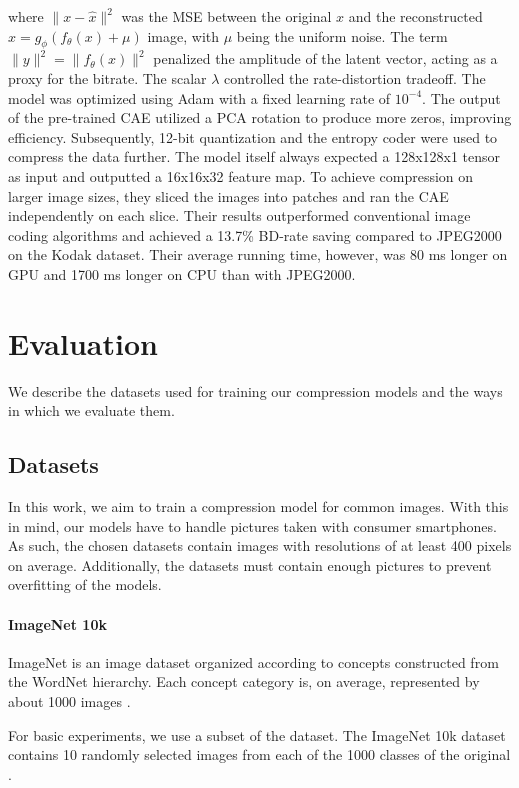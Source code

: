 \documentclass[conference]{IEEEtran}
\begin{document}
\noindent where $\|x - \hat{x}\|^2$ was the MSE between the original $x$ 
and the reconstructed $\hat{x} = g_\phi(f_\theta(x) + \mu)$ image, with $\mu$ being the 
uniform noise. 
The term $\|y\|^2 = \|f_\theta(x)\|^2$ penalized the amplitude of the latent vector, 
acting as a proxy for the bitrate. The scalar $\lambda$ controlled the rate-distortion 
tradeoff. The model was optimized using Adam with a fixed learning rate of $10^{-4}$. The output of the pre-trained CAE utilized a PCA rotation to produce more zeros, improving efficiency. Subsequently, 12-bit quantization and the entropy coder were used to compress the data further. The model itself always expected a 128x128x1 tensor as input and outputted a 16x16x32 feature map. To achieve compression on larger image sizes, they sliced the images into patches and ran the CAE independently on each slice. Their results outperformed conventional image coding algorithms and achieved a 13.7\% BD-rate saving compared to JPEG2000 on the Kodak dataset. Their average running time, however, was 80 ms longer on GPU and 1700 ms longer on CPU than with JPEG2000. 


\section{Evaluation}
We describe the datasets used for training our compression models and the ways in which we evaluate them.

\subsection{Datasets}
In this work, we aim to train a compression model for common images. With this in mind, our models have to handle pictures taken with consumer smartphones. As such, the chosen datasets contain images with resolutions of at least 400 pixels on average. Additionally, the datasets must contain enough pictures to prevent overfitting of the models.

\paragraph{ImageNet 10k}
ImageNet is an image dataset organized according to concepts constructed from the WordNet hierarchy. Each concept category is, on average, represented by about 1000 images \cite{noauthor_imagenet_nodate-1}.

For basic experiments, we use a subset of the dataset. The ImageNet 10k dataset contains 10 randomly selected images from each of the 1000 classes of the original \cite{noauthor_imagenet_nodate}. 
\end{document}
